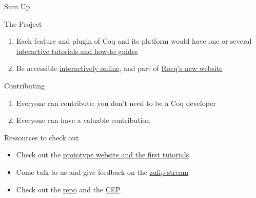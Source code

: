 \documentclass[10pt]{beamer}
\begin{document}
\begin{frame}[fragile]{Sum Up}
  \begin{tcbObj}{The Project}
    \begin{enumerate}[leftmargin=10pt]
      \item Each feature and plugin of Coq and its platform would have one
            or several \ul{interactive tutorials and how-to guides}
      \item Be accessible \ul{interactively online}, and part of \ul{Rocq's new website}
    \end{enumerate}
  \end{tcbObj}
  \begin{tcbObj}{Contributing}
    \begin{enumerate}[leftmargin=10pt]
      \item Everyone can contribute: you don't need to be a Coq developer
      \item Everyone can have a valuable contribution
    \end{enumerate}
  \end{tcbObj}
  \begin{tcbProp}{Ressources to check out}
    \begin{itemize}[label=$-$,leftmargin=10pt]
      \item Check out the \textcolor{blue}{\href{https://coq.inria.fr/platform-docs/}{prototype website and the first tutorials}}
      \item Come talk to us and give feedback on the \textcolor{blue}{\href{https://www.theozimmermann.net/platform-docs/}{zulip stream}}
      \item Check out the \textcolor{blue}{\href{https://github.com/coq/platform-docs}{repo}} and the \textcolor{blue}{\href{https://github.com/coq/ceps/pull/91}{CEP}}
    \end{itemize}
  \end{tcbProp}
\end{frame}
\end{document}
